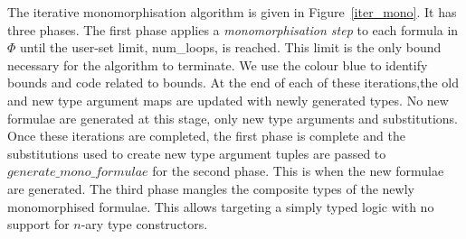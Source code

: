 \documentclass[runningheads]{llncs}
\begin{document}
The iterative monomorphisation algorithm is given in Figure~\ref{iter_mono}. It has three phases. The first phase applies a \emph{monomorphisation step} to each formula in \(\Phi\) until the user-set limit, \textcolor{ourblueviolet}{num\_loops}, is reached. This limit is the only bound necessary for the algorithm to terminate. We use the colour blue to identify bounds and code related to bounds. At the end of each of these iterations,\pagebreak[2]
the old and new type argument maps are updated with newly generated types. No new formulae are generated at this stage, only new type arguments and substitutions. Once these iterations are completed, the first phase is complete and the substitutions used to create new type argument tuples are passed to $\mathit{generate\_mono\_formulae}$ for the second phase. This is when the new formulae are generated. The third phase mangles the composite types of the newly monomorphised formulae. This allows targeting a simply typed logic with no support for $n$-ary type constructors.
\end{document}
